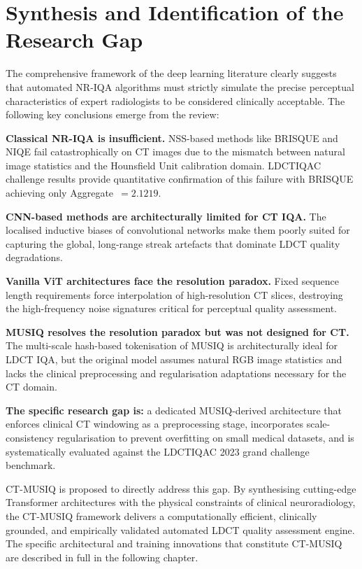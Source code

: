 \section{Synthesis and Identification of the Research Gap}
\label{sec:lit_gap}

The comprehensive framework of the deep learning literature clearly suggests that automated
NR-IQA algorithms must strictly simulate the precise perceptual characteristics of expert
radiologists to be considered clinically acceptable. The following key conclusions emerge
from the review:

\textbf{Classical NR-IQA is insufficient.} NSS-based methods like BRISQUE and NIQE fail
catastrophically on CT images due to the mismatch between natural image statistics and
the Hounsfield Unit calibration domain. LDCTIQAC challenge results provide quantitative
confirmation of this failure with BRISQUE achieving only Aggregate~$= 2.1219$.

\textbf{CNN-based methods are architecturally limited for CT IQA.} The localised
inductive biases of convolutional networks make them poorly suited for capturing the
global, long-range streak artefacts that dominate LDCT quality degradations.

\textbf{Vanilla ViT architectures face the resolution paradox.} Fixed sequence length
requirements force interpolation of high-resolution CT slices, destroying the
high-frequency noise signatures critical for perceptual quality assessment.

\textbf{MUSIQ resolves the resolution paradox but was not designed for CT.} The
multi-scale hash-based tokenisation of MUSIQ is architecturally ideal for LDCT IQA,
but the original model assumes natural RGB image statistics and lacks the clinical
preprocessing and regularisation adaptations necessary for the CT domain.

\textbf{The specific research gap is:} a dedicated MUSIQ-derived architecture that
enforces clinical CT windowing as a preprocessing stage, incorporates scale-consistency
regularisation to prevent overfitting on small medical datasets, and is systematically
evaluated against the LDCTIQAC 2023 grand challenge benchmark.

CT-MUSIQ is proposed to directly address this gap. By synthesising cutting-edge
Transformer architectures with the physical constraints of clinical neuroradiology, the
CT-MUSIQ framework delivers a computationally efficient, clinically grounded, and
empirically validated automated LDCT quality assessment engine. The specific architectural
and training innovations that constitute CT-MUSIQ are described in full in the following
chapter.


